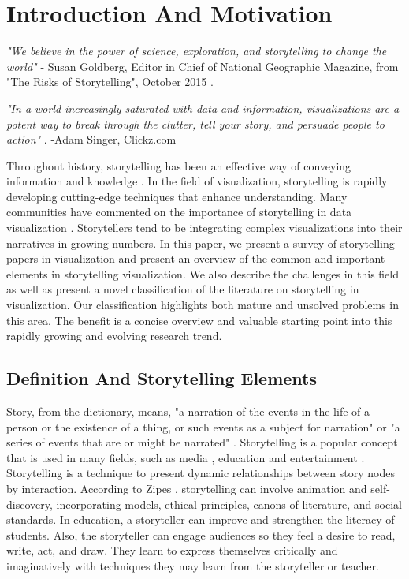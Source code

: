 \documentclass{egpubl}
\begin{document}
\section{Introduction And Motivation}
\textit{"We believe in the power of science, exploration, and storytelling to change the world"} - Susan Goldberg, Editor in Chief of National Geographic Magazine, from "The Risks of Storytelling", October 2015 \cite{risks2015}. 

\textit{"In a world increasingly saturated with data and information, visualizations are a potent way to break through the clutter, tell your story, and persuade people to action"} \cite{adam2015}. -Adam Singer, Clickz.com

Throughout history, storytelling has been an effective way of conveying information and knowledge \cite{Lidal2013}. In the field of visualization, storytelling is rapidly developing cutting-edge techniques that enhance understanding. Many communities have commented on the importance of storytelling in data visualization \cite{segal}. Storytellers tend to be integrating complex visualizations into their narratives in growing numbers. In this paper, we present a survey of storytelling papers in visualization and present an overview of the common and important elements in storytelling visualization. We also describe the challenges in this field as well as present a novel classification of the literature on storytelling in visualization. Our classification highlights both mature and unsolved problems in this area. The benefit is a concise overview and valuable starting point into this rapidly growing and evolving research trend. 

\subsection{Definition And Storytelling Elements}
Story, from the dictionary, means, "a narration of the events in the life of a person or the existence of a thing, or such events as a subject for narration" \cite{story1} or "a series of events that are or might be narrated" \cite{story2}. Storytelling is a popular concept that is used in many fields, such as media \cite{segal}, education \cite{Jack1995} and entertainment \cite{Schell:2008}.%
Storytelling is a technique to present dynamic relationships between story nodes by interaction.
According to Zipes \cite{Jack1995}, storytelling can involve animation and self-discovery, incorporating models, ethical principles, canons of literature, and social standards. In education, a storyteller can improve and strengthen the literacy of students. Also, the storyteller can engage audiences so they feel a desire to read, write, act, and draw. They learn to express themselves critically and imaginatively with techniques they may learn from the storyteller or teacher.
\end{document}
